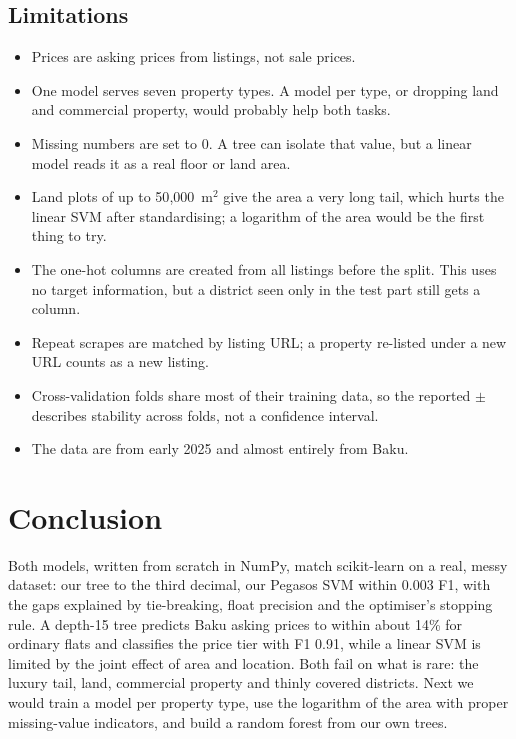 \documentclass[10pt,twocolumn,a4paper]{article}
\begin{document}
\subsection{Limitations}
\begin{itemize}
  \item Prices are asking prices from listings, not sale prices.
  \item One model serves seven property types. A model per type, or
        dropping land and commercial property, would probably help both
        tasks.
  \item Missing numbers are set to 0. A tree can isolate that value, but a
        linear model reads it as a real floor or land area.
  \item Land plots of up to 50{,}000~m$^2$ give the area a very long tail,
        which hurts the linear SVM after standardising; a logarithm of
        the area would be the first thing to try.
  \item The one-hot columns are created from all listings before the
        split. This uses no target information, but a district seen only
        in the test part still gets a column.
  \item Repeat scrapes are matched by listing URL; a property re-listed
        under a new URL counts as a new listing.
  \item Cross-validation folds share most of their training data, so the
        reported $\pm$ describes stability across folds, not a confidence
        interval.
  \item The data are from early 2025 and almost entirely from Baku.
\end{itemize}

\section{Conclusion}
Both models, written from scratch in NumPy, match
scikit-learn on a real, messy dataset: our tree to the third decimal, our
Pegasos SVM within 0.003 F1, with the gaps explained by tie-breaking,
float precision and the optimiser's stopping rule. A depth-15 tree
predicts Baku asking prices to within about 14\% for ordinary flats and
classifies the price tier with F1 0.91, while a linear SVM is limited by
the joint effect of area and location. Both fail on what is rare: the
luxury tail, land, commercial property and thinly covered districts. Next
we would train a model per property type, use the logarithm of the area
with proper missing-value indicators, and build a random forest from our
own trees.
\end{document}
